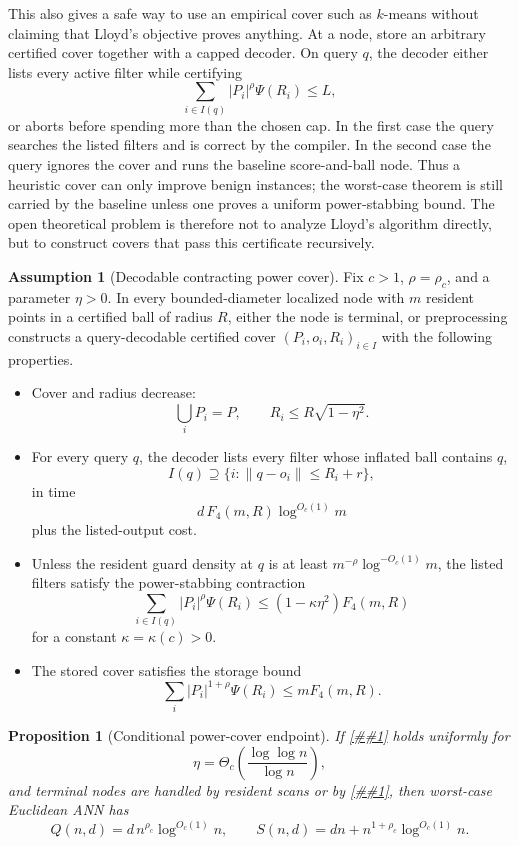 \documentclass[10pt]{article}
\newcommand{\cref}[1]{\ref{##1}}
\newtheorem{proposition}[theorem]{Proposition}
\theoremstyle{definition}
\newtheorem{assumption}[theorem]{Assumption}
\begin{document}
This also gives a safe way to use an empirical cover such as $k$-means without
claiming that Lloyd's objective proves anything. At a node, store an arbitrary
certified cover together with a capped decoder. On query $q$, the decoder either
lists every active filter while certifying
\[
   \sum_{i\in I(q)} |P_i|^\rho\Psi(R_i)\le L,
\]
or aborts before spending more than the chosen cap. In the first case the query
searches the listed filters and is correct by the compiler. In the second case
the query ignores the cover and runs the baseline score-and-ball node. Thus a
heuristic cover can only improve benign instances; the worst-case theorem is
still carried by the baseline unless one proves a uniform power-stabbing bound.
The open theoretical problem is therefore not to analyze Lloyd's algorithm
directly, but to construct covers that pass this certificate recursively.

\begin{assumption}[Decodable contracting power cover]\label{asm:power-cover}
   Fix $c>1$, $\rho=\rho_c$, and a parameter $\eta>0$. In every bounded-diameter
   localized node with $m$ resident points in a certified ball of radius $R$,
   either the node is terminal, or preprocessing constructs a query-decodable
   certified cover $(P_i,o_i,R_i)_{i\in I}$ with the following properties.
   \begin{itemize}
      \item Cover and radius decrease:
      \[
         \bigcup_iP_i=P,
         \qquad
         R_i\le R\sqrt{1-\eta^2}.
      \]
      \item For every query $q$, the decoder lists every filter whose inflated
      ball contains $q$,
      \[
         I(q)\supseteq\{i:\|q-o_i\|\le R_i+r\},
      \]
      in time
      \[
         d\,F_4(m,R)\log^{O_c(1)}m
      \]
      plus the listed-output cost.
      \item Unless the resident guard density at $q$ is at least
      $m^{-\rho}\log^{-O_c(1)}m$, the listed filters satisfy the power-stabbing
      contraction
      \[
         \sum_{i\in I(q)} |P_i|^\rho\Psi(R_i)
         \le
         (1-\kappa\eta^2)F_4(m,R)
      \]
      for a constant $\kappa=\kappa(c)>0$.
      \item The stored cover satisfies the storage bound
      \[
         \sum_i |P_i|^{1+\rho}\Psi(R_i)
         \le
         mF_4(m,R) .
      \]
   \end{itemize}
\end{assumption}

\begin{proposition}[Conditional power-cover endpoint]\label{prop:power-cover-polylog}
   If \cref{asm:power-cover} holds uniformly for
   \[
      \eta=\Theta_c\!\left(\frac{\log\log n}{\log n}\right),
   \]
   and terminal nodes are handled by resident scans or by
   \cref{thm:smooth-product-terminal}, then worst-case Euclidean ANN has
   \[
      Q(n,d)=d\,n^{\rho_c}\log^{O_c(1)}n,
      \qquad
      S(n,d)=dn+n^{1+\rho_c}\log^{O_c(1)}n .
   \]
\end{proposition}
\end{document}
